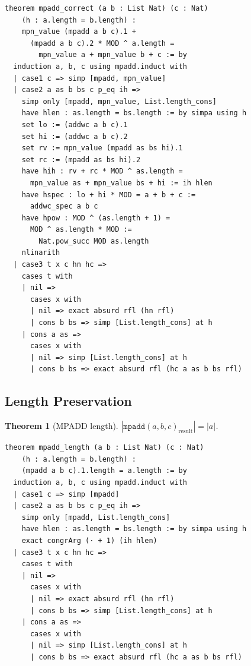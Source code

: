 \documentclass[11pt,a4paper]{article}
\newtheorem{theorem}{Theorem}[section]
\begin{document}
\begin{lstlisting}[style=lean,caption={MPADD correctness proof}]
theorem mpadd_correct (a b : List Nat) (c : Nat)
    (h : a.length = b.length) :
    mpn_value (mpadd a b c).1 +
      (mpadd a b c).2 * MOD ^ a.length =
        mpn_value a + mpn_value b + c := by
  induction a, b, c using mpadd.induct with
  | case1 c => simp [mpadd, mpn_value]
  | case2 a as b bs c p_eq ih =>
    simp only [mpadd, mpn_value, List.length_cons]
    have hlen : as.length = bs.length := by simpa using h
    set lo := (addwc a b c).1
    set hi := (addwc a b c).2
    set rv := mpn_value (mpadd as bs hi).1
    set rc := (mpadd as bs hi).2
    have hih : rv + rc * MOD ^ as.length =
      mpn_value as + mpn_value bs + hi := ih hlen
    have hspec : lo + hi * MOD = a + b + c :=
      addwc_spec a b c
    have hpow : MOD ^ (as.length + 1) =
      MOD ^ as.length * MOD :=
        Nat.pow_succ MOD as.length
    nlinarith
  | case3 t x c hn hc =>
    cases t with
    | nil =>
      cases x with
      | nil => exact absurd rfl (hn rfl)
      | cons b bs => simp [List.length_cons] at h
    | cons a as =>
      cases x with
      | nil => simp [List.length_cons] at h
      | cons b bs => exact absurd rfl (hc a as b bs rfl)
\end{lstlisting}

\subsection{Length Preservation}

\begin{theorem}[MPADD length]
\label{thm:mpadd-length}
$|\mathtt{mpadd}(a,b,c)_{\mathrm{result}}| = |a|$.
\end{theorem}

\begin{lstlisting}[style=lean,caption={MPADD preserves length}]
theorem mpadd_length (a b : List Nat) (c : Nat)
    (h : a.length = b.length) :
    (mpadd a b c).1.length = a.length := by
  induction a, b, c using mpadd.induct with
  | case1 c => simp [mpadd]
  | case2 a as b bs c p_eq ih =>
    simp only [mpadd, List.length_cons]
    have hlen : as.length = bs.length := by simpa using h
    exact congrArg (· + 1) (ih hlen)
  | case3 t x c hn hc =>
    cases t with
    | nil =>
      cases x with
      | nil => exact absurd rfl (hn rfl)
      | cons b bs => simp [List.length_cons] at h
    | cons a as =>
      cases x with
      | nil => simp [List.length_cons] at h
      | cons b bs => exact absurd rfl (hc a as b bs rfl)
\end{lstlisting}
\end{document}
